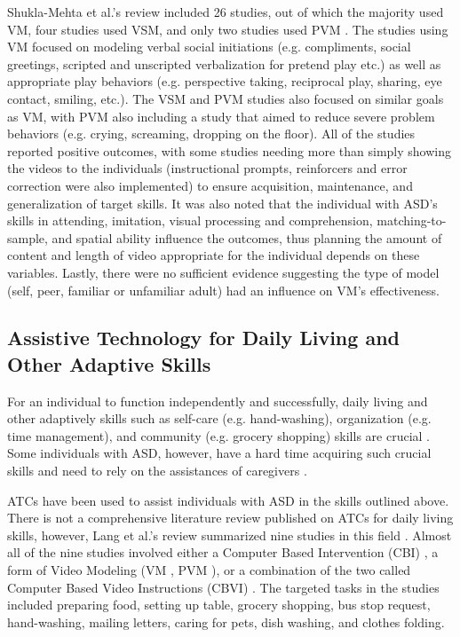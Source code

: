 \documentclass{ut-thesis}
\begin{document}
Shukla-Mehta et al.'s review included 26 studies, out of which the majority used VM, four studies used VSM, and only two studies used PVM \cite{shukla2009evaluating}.  The studies using VM focused on modeling verbal social initiations (e.g. compliments, social greetings, scripted and unscripted verbalization for pretend play etc.) as well as appropriate play behaviors (e.g. perspective taking, reciprocal play, sharing, eye contact, smiling, etc.).  The VSM and PVM studies also focused on similar goals as VM, with PVM also including a study that aimed to reduce severe problem behaviors (e.g. crying, screaming, dropping on the floor).  All of the studies reported positive outcomes, with some studies needing more than simply showing the videos to the individuals (instructional prompts, reinforcers and error correction were also implemented) to ensure acquisition, maintenance, and generalization of target skills.  It was also noted that the individual with ASD's skills in attending, imitation, visual processing and comprehension, matching-to-sample, and spatial ability influence the outcomes, thus planning the amount of content and length of video appropriate for the individual depends on these variables.  Lastly, there were no sufficient evidence suggesting the type of model (self, peer, familiar or unfamiliar adult) had an influence on VM's effectiveness.

\subsection{Assistive Technology for Daily Living and Other Adaptive Skills}
For an individual to function independently and successfully, daily living and other adaptively skills such as self-care (e.g. hand-washing), organization (e.g. time management), and community (e.g. grocery shopping) skills are crucial \cite{liss2001predictors}.  Some individuals with ASD, however, have a hard time acquiring such crucial skills and need to rely on the assistances of caregivers \cite{smith2012developmental}.

ATCs have been used to assist individuals with ASD in the skills outlined above.  There is not a comprehensive literature review published on ATCs for daily living skills, however, Lang et al.'s review summarized nine studies in this field \cite{lang2014assistive}.  Almost all of the nine studies involved either a Computer Based Intervention (CBI) \cite{hutcherson2004computer}, a form of Video Modeling (VM \cite{rosenberg2010evaluating}, PVM \cite{bereznak2012video, shipley2002teaching, sigafoos2007evaluation, sigafoos2005computer, van2010comparison}), or a combination of the two called Computer Based Video Instructions (CBVI) \cite{ayres2009acquisition, mechling2010computer}.  The targeted tasks in the studies included preparing food, setting up table, grocery shopping, bus stop request, hand-washing, mailing letters, caring for pets, dish washing, and clothes folding.
\end{document}
